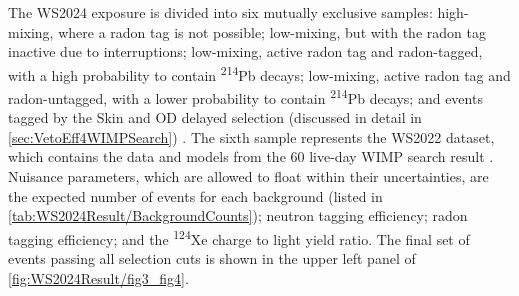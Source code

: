 The WS2024 exposure is divided into six mutually exclusive samples: high-mixing, where a radon tag is not possible; low-mixing, but with the radon tag inactive due to interruptions; low-mixing, active radon tag and radon-tagged, with a high probability to contain \textsuperscript{214}Pb decays; low-mixing, active radon tag and radon-untagged, with a lower probability to contain \textsuperscript{214}Pb decays; and events tagged by the Skin and OD delayed selection (discussed in detail in \autoref{sec:VetoEff4WIMPSearch}) \cite{LZCollaboration:2024lux}. The sixth sample represents the WS2022 dataset, which contains the data and models from the 60 live-day WIMP search result \cite{LZ:2022lsv}. Nuisance parameters, which are allowed to float within their uncertainties, are the expected number of events for each background (listed in \autoref{tab:WS2024Result/BackgroundCounts}); neutron tagging efficiency; radon tagging efficiency; and the \textsuperscript{124}Xe charge to light yield ratio. The final set of events passing all selection cuts is shown in the upper left panel of \autoref{fig:WS2024Result/fig3_fig4}.

